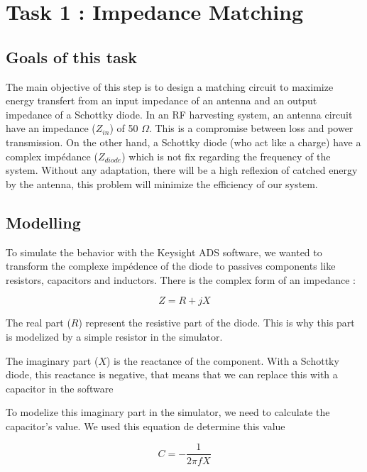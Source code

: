 \section{Task 1 : Impedance Matching}
\label{sec:task1}

\subsection{Goals of this task}
The main objective of this step is to design a matching circuit to maximize energy transfert from
 an input impedance of an antenna and an output impedance of a Schottky diode. 
 In an RF harvesting system, an antenna circuit have an impedance ($Z_{in}$) of 50 $\Omega$. 
 This is a compromise between loss and power transmission. On the other hand, a Schottky diode 
 (who act like a charge) have a complex impédance ($Z_{diode}$) which is not fix regarding the frequency 
 of the system. Without any adaptation, there will be a high reflexion of catched energy by the antenna, 
 this problem will minimize the efficiency of our system.

\subsection{Modelling}

To simulate the behavior with the Keysight ADS software, we wanted to transform the complexe impédence 
of the diode to passives components like resistors, capacitors and inductors. There is the complex form of an impedance :  

\begin{equation} \label{eq:complex_form_impedance}
    Z = R + jX
\end{equation}

The real part ($R$) represent the resistive part of the diode. 
This is why this part is modelized by a simple resistor in the simulator.

The imaginary part ($X$) is the reactance of the component. 
With a Schottky diode, this reactance is negative, that means that we can replace this with a capacitor in the software

To modelize this imaginary part in the simulator, we need to calculate the capacitor’s value. 
We used this equation de determine this value

\begin{equation} \label{eq:capacitor_value}
    C = -\frac{1}{2\pi f X}
\end{equation}

